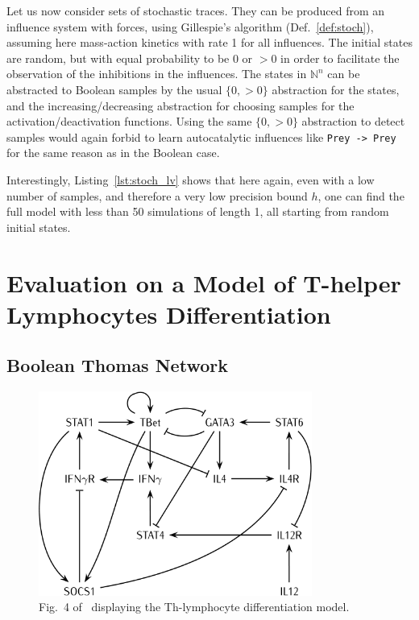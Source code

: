 \documentclass{llncs}
\begin{document}
Let us now consider sets of stochastic traces. They can be produced from an influence system with forces, using Gillespie's
algorithm (Def.~\ref{def:stoch}), assuming here mass-action kinetics with rate 1 for all influences.
The initial states are random, but with equal probability to be 0 or $>0$ in
order to facilitate the observation of the inhibitions in the influences.
The states in ${\mathbb{N}}^n$ can be abstracted to
Boolean samples by the usual $\{0, >0\}$ abstraction for the states, and the
increasing/decreasing abstraction for choosing samples for the
activation/deactivation functions. Using the same $\{0, >0\}$ abstraction to
detect samples would again forbid to learn autocatalytic influences like
\texttt{Prey -> Prey} for the same reason as in the Boolean case.

Interestingly, Listing~\ref{lst:stoch_lv} shows that here again, even with a low number of
samples, and therefore a very low precision bound $h$, one can find the full model with less than 50
simulations of length 1, all starting from random initial states.



\section{Evaluation on a Model of T-helper Lymphocytes Differentiation}\label{ex:lympho}

\subsection{Boolean Thomas Network}


\begin{figure}[htbp]
   \centering
   \includegraphics[width=0.8\textwidth]{th_net_clean.png}
   \caption{Fig.~4 of~\cite{RRMTC06tcsb} displaying the Th-lymphocyte
   differentiation model.\label{fig:lympho}}
\end{figure}
\end{document}
